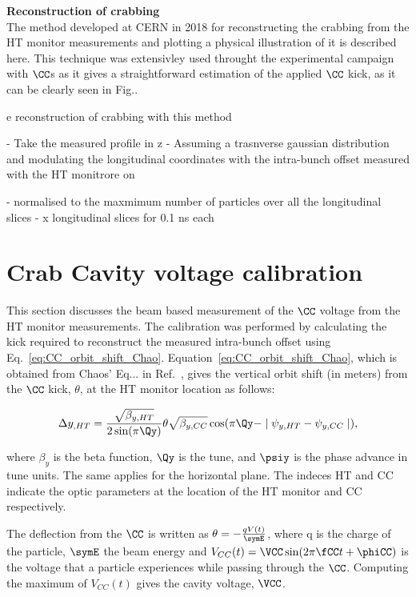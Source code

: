 \normalsize{\textbf{Reconstruction of crabbing}}\\
The method developed at CERN in 2018 for reconstructing the crabbing from the HT monitor measurements and plotting a physical illustration of it is described here. This technique was extensivley used throught the experimental campaign with $\CC$s as it gives a straightforward estimation of the applied $\CC$ kick, as it can be clearly seen in Fig..




e reconstruction of crabbing with this method


- Take the measured profile in z
- 
Assuming a trasnverse gaussian distribution and modulating the longitudinal coordinates with the intra-bunch offset measured with the HT monitrore on

- normalised to the maxmimum number of particles over all the longitudinal slices
- x longitudinal slices for 0.1 ns each


 \section{Crab Cavity voltage calibration}\label{sec:Vcc_calibration}

 This section discusses the beam based measurement of the $\CC$ voltage from the HT monitor measurements. The calibration was performed by calculating the kick required to reconstruct the measured intra-bunch offset using Eq.~\eqref{eq:CC_orbit_shift_Chao}. Equation~\eqref{eq:CC_orbit_shift_Chao}, which is obtained from Chaos' Eq... in Ref.~\cite{Chao:1490001}, gives the vertical orbit shift (in meters) from the $\CC$ kick, $\theta$, at the HT monitor location as follows:


\begin{equation}\label{eq:CC_orbit_shift_Chao}
   \Delta y_{,HT} = \frac{\sqrt{\beta_{y, HT}}}{2 \sin(\pi \Qy)} \theta \sqrt{\beta_{y, CC}} \cos(\pi \Qy - \mid \psi_{y, HT} - \psi_{y, CC} \mid),
\end{equation}

where $\beta_y$ is the beta function, $\Qy$ is the tune, and $\psiy$ is the phase advance in tune units. The same applies for the horizontal plane. The indeces HT and CC indicate the optic parameters at the location of the HT monitor and CC respectively.

The deflection from the $\CC$ is written as $\theta = - \frac{q V(t)}{\symE}$, where q is the charge of the particle, $\symE$ the beam energy and $V_{CC}(t) = \VCC \sin(2 \pi \fCC t + \phiCC) $ is the voltage that a particle experiences while passing through the $\CC$. Computing the maximum of $V_{CC}(t)$ gives the cavity voltage, $\VCC$. 

